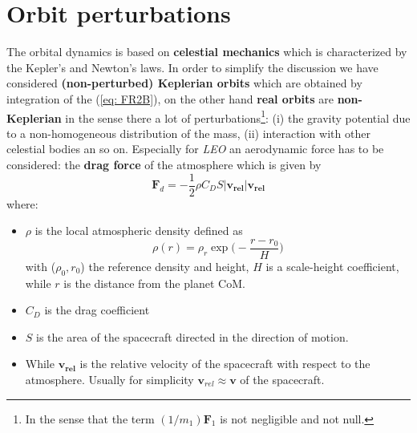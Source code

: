 \section{Orbit perturbations}
The orbital dynamics is based on \textbf{celestial mechanics} which is characterized by the Kepler's and Newton's laws. In order to simplify the discussion we have considered \textbf{(non-perturbed) Keplerian orbits} which are obtained by integration of the (\ref{eq: FR2B}), on the other hand \textbf{real orbits} are \textbf{non-Keplerian} in the sense there a lot of perturbations{\footnote[12]{
    In the sense that the term $(1/m_1) \mathbf{F}_1$ is not negligible and not null. 
}}: (i) the gravity potential due to a non-homogeneous distribution of the mass, (ii) interaction with other celestial bodies an so on.
Especially for \textit{LEO} an aerodynamic force has to be considered: the \textbf{drag force} of the atmosphere which is given by
\begin{equation}
    \mathbf{F}_d = -\frac{1}{2} \rho C_D S \vert \mathbf{v_{rel}} \vert \mathbf{v_{rel}}
\end{equation}
where:
\begin{itemize}
    \itemsep0em
    \item $\rho$ is the local atmospheric density defined as 
    \begin{equation*}
        \rho(r) = \rho_r \exp\biggl(
            -\frac{r-r_0}{H}
        \biggr)
    \end{equation*}
    with ($\rho_0, r_0$) the reference density and height, $H$ is a scale-height coefficient, while $r$ is the distance from the planet CoM.
    \item $C_D$ is the drag coefficient 
    \item $S$ is the area of the spacecraft directed in the direction of motion.
    \item While $\mathbf{v_{rel}}$ is the relative velocity of the spacecraft with respect to the atmosphere. Usually for simplicity $\mathbf{v}_{rel} \approx \mathbf{v}$ of the spacecraft.
\end{itemize}